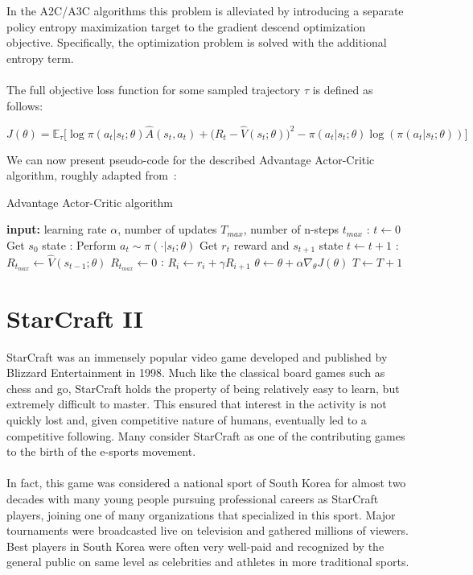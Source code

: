 \\\\
In the A2C/A3C algorithms this problem is alleviated by introducing a separate policy entropy maximization target to the gradient descend optimization objective. Specifically, the optimization problem is solved with the additional entropy term.
\\\\
The full objective loss function for some sampled trajectory $\tau$ is defined as follows:

$$J(\theta) = \mathbb{E}_{\tau} \bigg[\log \pi(a_t|s_t;\theta)\hat{A}(s_t, a_t) + \big(R_t - \hat{V}(s_t;\theta) \big)^2  - \pi(a_t|s_t;\theta) \log(\pi(a_t|s_t;\theta))\bigg]$$

\noindent We can now present pseudo-code for the described Advantage Actor-Critic algorithm, roughly adapted from~\cite{mnih16}:

\begin{algorithm}
\caption{Advantage Actor-Critic algorithm}
\begin{algorithmic}
\State \textbf{input:} learning rate $\alpha$, number of updates $T_{max}$, number of n-steps $t_{max}$
:
  \State $t \leftarrow 0$
  \State Get $s_0$ state
  :
    \State Perform $a_t \sim \pi(\cdot|s_t;\theta)$
    \State Get $r_t$ reward and $s_{t+1}$ state
    \State $t \leftarrow t + 1$
  \EndWhile
  :
    \State $R_{t_{max}} \leftarrow \hat{V}(s_{t-1};\theta)$
  \Else
    \State $R_{t_{max}} \leftarrow 0$
  \EndIf
  :
    \State $R_i \leftarrow r_i + \gamma R_{i+1}$
  \EndFor
  \State $\theta \leftarrow \theta + \alpha \nabla_{\theta} J(\theta)$
  \State $T \leftarrow T + 1$
\EndWhile
\end{algorithmic}
\end{algorithm}

\section{StarCraft II}

StarCraft was an immensely popular video game developed and published by Blizzard Entertainment in 1998. Much like the classical board games such as chess and go, StarCraft holds the property of being relatively easy to learn, but extremely difficult to master. This ensured that interest in the activity is not quickly lost and, given competitive nature of humans, eventually led to a competitive following. Many consider StarCraft as one of the contributing games to the birth of the e-sports movement.
\\\\
In fact, this game was considered a national sport of South Korea for almost two decades with many young people pursuing professional careers as StarCraft players, joining one of many organizations that specialized in this sport. Major tournaments were broadcasted live on television and gathered millions of viewers. Best players in South Korea were often very well-paid and recognized by the general public on same level as celebrities and athletes in more traditional sports. %

